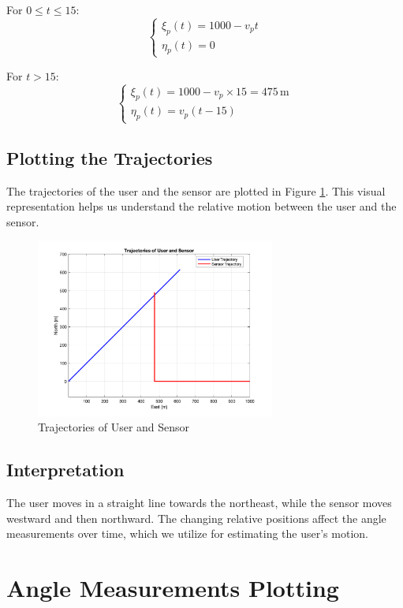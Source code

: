 \documentclass[12pt]{article}
\begin{document}
For \( 0 \leq t \leq 15 \):
\[
\begin{cases}
\xi_p(t) = 1000 - v_p t \\
\eta_p(t) = 0
\end{cases}
\]

For \( t > 15 \):
\[
\begin{cases}
\xi_p(t) = 1000 - v_p \times 15 = 475\, \text{m} \\
\eta_p(t) = v_p (t - 15)
\end{cases}
\]

\subsection{Plotting the Trajectories}

The trajectories of the user and the sensor are plotted in Figure \ref{fig:trajectories}. This visual representation helps us understand the relative motion between the user and the sensor.

\begin{figure}[H]
    \centering
    \includegraphics[width=0.7\textwidth]{trajectories.png}
    \caption{Trajectories of User and Sensor}
    \label{fig:trajectories}
\end{figure}

\subsection{Interpretation}

The user moves in a straight line towards the northeast, while the sensor moves westward and then northward. The changing relative positions affect the angle measurements over time, which we utilize for estimating the user's motion.

\section{Angle Measurements Plotting}
\end{document}
